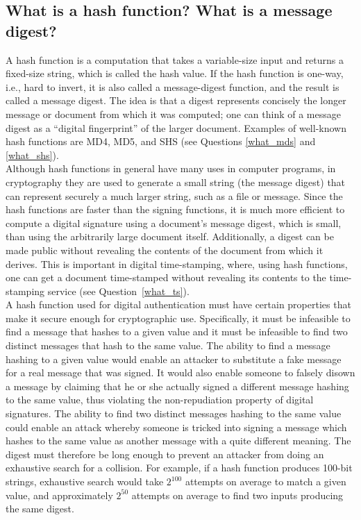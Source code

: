 \subsection{What is a hash function? What is a message digest?}
\label{what_hash}

A hash function is a computation that takes a variable-size input and
returns a fixed-size string, which is called the hash value. If the hash
function is one-way, i.e., hard to invert, it is also called a
message-digest function, and the result is called a message digest. The
idea is that a digest represents concisely the longer message or document
from which it was computed; one can think of a message digest as a
``digital fingerprint'' of the larger document. Examples of well-known hash
functions are MD4, MD5, and SHS (see Questions \ref{what_mds} and
\ref{what_shs}).\\

Although hash functions in general have many uses in computer programs,
in cryptography they are used to generate a small string (the message
digest) that can represent securely a much larger string, such as a
file or message. Since the hash functions are faster than the signing
functions, it is much more efficient to compute a digital signature
using a document's message digest, which is small, than using the
arbitrarily large document itself. Additionally, a digest can be made
public without revealing the contents of the document from which it
derives. This is important in digital time-stamping, where, using hash
functions, one can get a document time-stamped without revealing its
contents to the time-stamping service (see Question~\ref{what_ts}).\\

A hash function used for digital authentication must have certain
properties that make it secure enough for cryptographic use.
Specifically, it must be infeasible to find a message that hashes to a
given value and it must be infeasible to find two distinct messages
that hash to the same value. The ability to find a message hashing to a
given value would enable an attacker to substitute a fake message for a
real message that was signed. It would also enable someone to falsely
disown a message by claiming that he or she actually signed a different
message hashing to the same value, thus violating the non-repudiation
property of digital signatures. The ability to find two distinct
messages hashing to the same value could enable an attack whereby
someone is tricked into signing a message which hashes to the same
value as another message with a quite different meaning. The digest
must therefore be long enough to prevent an attacker from doing an
exhaustive search for a collision. For example, if a hash function
produces 100-bit strings, exhaustive search would take $2^{100}$ attempts
on average to match a given value, and approximately $2^{50}$ attempts on
average to find two inputs producing the same digest.\\

